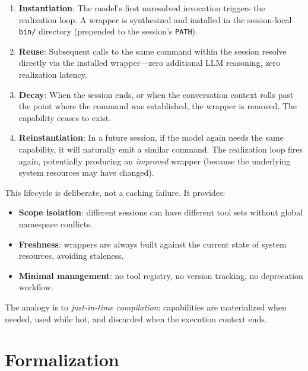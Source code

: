 \documentclass[11pt]{article}
\begin{document}
\begin{enumerate}[leftmargin=*]
  \item \textbf{Instantiation}: The model's first unresolved invocation triggers the realization loop. A wrapper is synthesized and installed in the session-local \texttt{bin/} directory (prepended to the session's \texttt{PATH}).

  \item \textbf{Reuse}: Subsequent calls to the same command within the session resolve directly via the installed wrapper---zero additional LLM reasoning, zero realization latency.

  \item \textbf{Decay}: When the session ends, or when the conversation context rolls past the point where the command was established, the wrapper is removed. The capability ceases to exist.

  \item \textbf{Reinstantiation}: In a future session, if the model again needs the same capability, it will naturally emit a similar command. The realization loop fires again, potentially producing an \emph{improved} wrapper (because the underlying system resources may have changed).
\end{enumerate}

This lifecycle is deliberate, not a caching failure. It provides:
\begin{itemize}[leftmargin=*]
  \item \textbf{Scope isolation}: different sessions can have different tool sets without global namespace conflicts.
  \item \textbf{Freshness}: wrappers are always built against the current state of system resources, avoiding staleness.
  \item \textbf{Minimal management}: no tool registry, no version tracking, no deprecation workflow.
\end{itemize}

The analogy is to \emph{just-in-time compilation}: capabilities are materialized when needed, used while hot, and discarded when the execution context ends.

\section{Formalization}
\label{sec:formalization}
\end{document}
